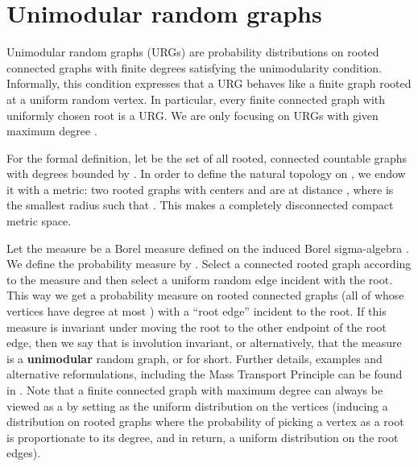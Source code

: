 \documentclass[12pt,a4paper]{article}
\renewcommand{\:}{\colon}
\begin{document}
\section{Unimodular random graphs}

Unimodular random graphs (URGs) are probability distributions on rooted connected graphs with finite degrees satisfying the unimodularity condition. 
Informally, this condition expresses that a URG behaves like a finite graph rooted at a uniform random vertex. 
In particular, every finite connected graph with uniformly chosen root is a URG. 
We are only focusing on URGs with given maximum degree . 

For the formal definition, let  be the set of all rooted, connected countable graphs with degrees bounded by . 
In order to define the natural topology on , we endow it with a metric: two rooted graphs with centers  and  are at distance , where  is the smallest radius such that . 
This makes  a completely disconnected compact metric space. 

Let the measure  be a Borel measure defined on the induced Borel sigma-algebra . 
We define the probability measure  by . 
Select a connected rooted graph according to the measure  and then select a uniform random edge  incident with the root. 
This way we get a probability measure on rooted connected graphs (all of whose vertices have degree at most ) with a ``root edge'' incident to the root. 
If this measure is invariant under moving the root to the other endpoint of the root edge, then we say that  is involution invariant, or alternatively, that the measure is a \textbf{unimodular} random graph, or  for short. 
Further details, examples and alternative reformulations, including the Mass Transport Principle can be found in \cite{Lovaszbook}. 
Note that a finite connected graph with maximum degree  can always be viewed as a  by setting  as the uniform distribution on the vertices (inducing a distribution  on rooted graphs where the probability of picking a vertex as a root is proportionate to its degree, and in return, a uniform distribution on the root edges).
\end{document}
